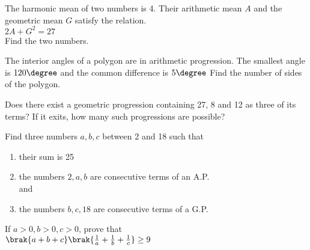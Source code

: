 \iffalse
\title{Sequence and Series}
\author{DHAWAL-ee24btech11015}
\section{subjective}
\fi

    \item The harmonic mean of two numbers is 4. Their arithmetic mean $A$ and the geometric mean $G$ satisfy the relation.
    \\
    $2A + G^2 = 27$
    \\
    Find the two numbers.  \hfill{}

\item The interior angles of a polygon are in arithmetic progression. The smallest angle is $120\degree$ and the common difference is $5\degree$ Find the number of sides of the polygon.

\hfill{}

    \item Does there exist a geometric progression containing 27, 8 and 12 as three of its terms? If it exits, how many such progressions are possible?  \hfill{}

    \item Find three numbers $a,b,c$ between 2 and 18 such that
    \begin{enumerate}
    \item their sum is 25
    \item the numbers $2,a,b$ are consecutive terms of an A.P.
    \\
    and
    \item the numbers $b,c,18$ are consecutive terms of a G.P.\hfill{}
    \end{enumerate}
  

    \item If $a>0,b>0,c>0$, prove that
    \\
    $\brak{a+b+c}\brak{\frac{1}{a}+\frac{1}{b}+\frac{1}{c}}\geq9$
    \hfill{}


